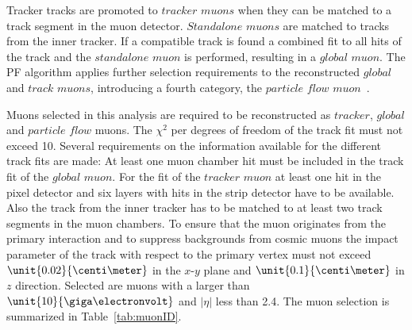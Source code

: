 Tracker tracks are promoted to $\textit{tracker muons}$ when they can be matched to a track segment in the muon detector. $\textit{Standalone muons}$ are matched to tracks from the inner tracker. If a compatible track is found a combined fit to all hits of the track and the $\textit{standalone muon}$ is performed, resulting in a $\textit{global muon}$. The PF algorithm applies further selection requirements to the reconstructed $\textit{global}$ and $\textit{track muons}$, introducing a fourth category, the $\textit{particle flow muon}$~\cite{CMS-PAS-PFT-10-003}. 

Muons selected in this analysis are required to be reconstructed as $\textit{tracker}$, $\textit{global}$ and $\textit{particle flow}$ muons. The $\chi^2$ per degrees of freedom of the track fit must not exceed 10. Several requirements on the information available for the different track fits are made: At least one muon chamber hit must be included in the track fit of the $\textit{global muon}$. For the fit of the $\textit{tracker muon}$ at least one hit in the pixel detector and six layers with hits in the strip detector have to be available. Also the track from the inner tracker has to be matched to at least two track segments in the muon chambers. To ensure that the muon originates from the primary interaction and to suppress backgrounds from cosmic muons the impact parameter of the track with respect to the primary vertex must not exceed $\unit{0.02}{\centi\meter}$ in the $x$-$y$ plane and $\unit{0.1}{\centi\meter}$ in $z$ direction. Selected are muons with a \pt larger than $\unit{10}{\giga\electronvolt}$ and $|\eta|$ less than 2.4. The muon selection is summarized in Table~\ref{tab:muonID}.
